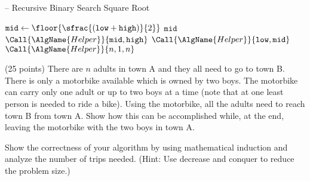 \documentclass[draft]{article}
\begin{document}
\begin{solution}\mbox{}
    \begin{algorithm}[H]
        \caption[]{ -- Recursive Binary Search Square Root}
        \label{alg:recbinsqrt}
        \begin{algorithmic}[1]
             
            \State $\texttt{mid} \gets \floor{\sfrac{(\texttt{low} + \texttt{high})}{2}}$   
            \State \Return $\texttt{mid}$
             
            \State \Return $\Call{\AlgName{Helper}}{\texttt{mid},\texttt{high}}$
            \Else {}
            \State \Return $\Call{\AlgName{Helper}}{\texttt{low}, \texttt{mid}}$
            \EndIf
            \EndFunction
            \State \Return $\Call{\AlgName{Helper}}{n, 1, n}$
            \EndFunction
        \end{algorithmic}
    \end{algorithm}
\end{solution}

\begin{exercise}{2.9} (25 points)
    There are $n$ adults in town A and they all need to go to town B. There is only a motorbike available which is owned by two boys.
    The motorbike can carry only one adult or up to two boys at a time (note that at one least person is needed to ride a bike). Using the motorbike, all the adults need to reach town B from town A.
    Show how this can be accomplished while, at the end, leaving the motorbike with the two boys in town A.

    Show the correctness of your algorithm by using mathematical induction and analyze the number of trips needed. (Hint: Use decrease and conquer to reduce the problem size.)
\end{exercise}
\end{document}
